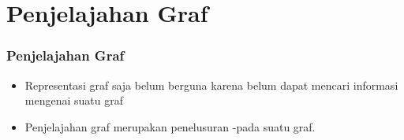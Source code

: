 \begin{comment}
\begin{frame}
\frametitle{Keuntungan dan Kerugian Representasi Graf}

\begin{itemize}
  \item Adjacency Matrix memakan lebih banyak memori. Hal ini dikarenakan adjacency matrix menyimpan keterangan dari satu node ke semua node. Sedangkan dalam adjacency list, suatu node hanya menyimpan keterangan mengenai node lain yang memiliki edge. Oleh karena itu, adjacency list lebih baik digunakan ketika edge yang terdapat tidak teralu banyak.
  \item Untuk melakukan pengecekan atau perubahan edge dari A ke B, pada adjacency matrix dapat dilakukan dengan hanya melihat dan mengubah matrix[A][B]. Sedangkan pada adjacency list, kita harus mengiterasi seluruh elemen pada list[A]
\end{itemize}
\end{frame}

\begin{frame}
\frametitle{Keuntungan dan Kerugian Representasi Graf (lanj.)}
\begin{itemize}
  \item Jika ada edge dari A ke B yang akan dibuang, maka pada adjacency matrix kita hanya perlu mengubah nilai Matrix[A][B]. Sedangkan pada adjacency list, harus dilakukan iterasi terlebih dahulu untuk mencari edge tersebut, lalu menghapusnya juga lebih rumit karena harus menggeser seluruh elemen setelahnya.
  \item Untuk mencari tetangga-tetangganya, maka pada adjacency matrix perlu dilakukan iterasi terhadap seluruh node yagn ada. Sementara itu, pada adjacency list hanya perlu dilakukan iterasi pada list yang isinya merupakan tetangga dari node yang bersangkutan.
\end{itemize}
\end{frame}
\end{comment}

\section{Penjelajahan Graf}
\frame{\sectionpage}

\begin{frame}
\frametitle{Penjelajahan Graf}
\begin{itemize}
  \item Representasi graf saja belum berguna karena belum dapat mencari informasi mengenai suatu graf
  \item \alert{Penjelajahan graf} merupakan penelusuran \fnode-\fnode pada suatu graf.
\end{itemize}
\end{frame}

